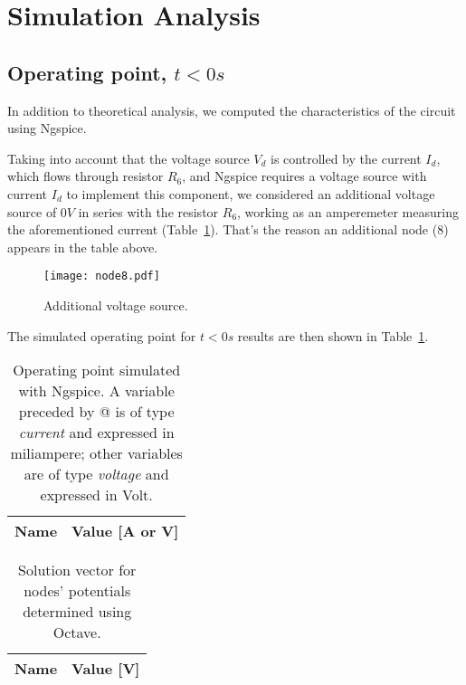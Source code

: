 \section{Simulation Analysis}
\label{sec:simulation}

\subsection{Operating point, $t<0s$} \label{subsec:op}

In addition to theoretical analysis, we computed the characteristics of the circuit using Ngspice.

Taking into account that the voltage source $V_d$ is controlled by the current $I_d$, which flows through resistor $R_6$, and Ngspice requires a voltage source with current $I_d$ to implement this component, we considered an additional voltage source of $0V$ in series with the resistor $R_6$, working as an amperemeter measuring the aforementioned current (Table~\ref{fig:node8}). That's the reason an additional node (8) appears in the table above.

\begin{figure}[H] \centering
\texttt{[image: node8.pdf]}
\caption{Additional voltage source.}
\label{fig:node8}
\end{figure}

The simulated operating point for $t<0s$ results are then shown in Table~\ref{tab:op11}.

\vspace{1mm}

\begin{table}[H]
  \centering
  \begin{tabular}{|l|r|}
    \hline    
    {\bf Name} & {\bf Value [A or V]} \\ \hline
    
  \end{tabular}
  \caption{Operating point simulated with Ngspice. A variable preceded by @ is of type {\em current}
    and expressed in miliampere; other variables are of type {\it voltage} and expressed in
    Volt.}
  \label{tab:op11}
\end{table}


\begin{table}[H]
  \centering
  \begin{tabular}{|l|r|}
    \hline    
    {\bf Name} & {\bf Value [V]} \\ \hline
    
  \end{tabular}
  \caption{Solution vector for nodes' potentials determined using Octave.}
  \label{tab:op12}
\end{table}


